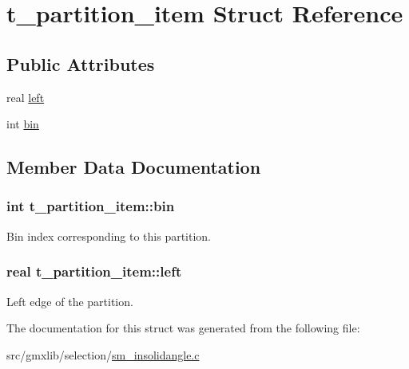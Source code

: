 \hypertarget{structt__partition__item}{\section{t\-\_\-partition\-\_\-item \-Struct \-Reference}
\label{structt__partition__item}
}
\subsection*{\-Public \-Attributes}
\begin{DoxyCompactItemize}
\item 
real \hyperlink{structt__partition__item_a26e3c34f0f1a7297b2b7e225f519a02e}{left}
\item 
int \hyperlink{structt__partition__item_ab2e078f256401b8d964d49a699bc3135}{bin}
\end{DoxyCompactItemize}


\subsection{\-Member \-Data \-Documentation}
\hypertarget{structt__partition__item_ab2e078f256401b8d964d49a699bc3135}{
\subsubsection[{bin}]{\setlength{\rightskip}{0pt plus 5cm}int {\bf t\-\_\-partition\-\_\-item\-::bin}}}\label{structt__partition__item_ab2e078f256401b8d964d49a699bc3135}
\-Bin index corresponding to this partition. \hypertarget{structt__partition__item_a26e3c34f0f1a7297b2b7e225f519a02e}{
\subsubsection[{left}]{\setlength{\rightskip}{0pt plus 5cm}real {\bf t\-\_\-partition\-\_\-item\-::left}}}\label{structt__partition__item_a26e3c34f0f1a7297b2b7e225f519a02e}
\-Left edge of the partition. 

\-The documentation for this struct was generated from the following file\-:\begin{DoxyCompactItemize}
\item 
src/gmxlib/selection/\hyperlink{sm__insolidangle_8c}{sm\-\_\-insolidangle.\-c}\end{DoxyCompactItemize}
